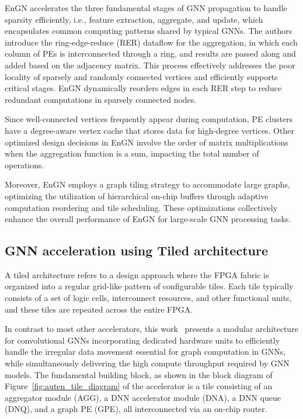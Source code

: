 EnGN accelerates the three fundamental stages of GNN propagation to handle sparsity efficiently, i.e., feature extraction, aggregate, and update, which encapsulates common computing patterns shared by typical GNNs.
The authors introduce the ring-edge-reduce (RER) dataflow for the aggregation, in which each column of PEs is interconnected through a ring, and results are passed along and added based on the adjacency matrix.
This process effectively addresses the poor locality of sparsely and randomly connected vertices and efficiently supports critical stages.
EnGN dynamically reorders edges in each RER step to reduce redundant computations in sparsely connected nodes.

Since well-connected vertices frequently appear during computation, PE clusters have a degree-aware vertex cache that stores data for high-degree vertices.
Other optimized design decisions in EnGN involve the order of matrix multiplications when the aggregation function is a sum, impacting the total number of operations.

Moreover, EnGN employs a graph tiling strategy to accommodate large graphs, optimizing the utilization of hierarchical on-chip buffers through adaptive computation reordering and tile scheduling.
These optimizations collectively enhance the overall performance of EnGN for large-scale GNN processing tasks.

\subsection{GNN acceleration using Tiled architecture}
\label{subsec:tiled-architectures}%

A tiled architecture refers to a design approach where the FPGA fabric is organized into a regular grid-like pattern of configurable tiles.
Each tile typically consists of a set of logic cells, interconnect resources, and other functional units, and these tiles are repeated across the entire FPGA.

In contrast to most other accelerators, this work~\cite{9218751} presents a modular architecture for convolutional GNNs incorporating dedicated hardware units to efficiently handle the irregular data movement essential for graph computation in GNNs, while simultaneously delivering the high compute throughput required by GNN models.
The fundamental building block, as shown in the block diagram of Figure~\ref{fig:auten_tile_diagram} of the accelerator is a tile consisting of an aggregator module (AGG), a DNN accelerator module (DNA), a DNN queue (DNQ), and a graph PE (GPE), all interconnected via an on-chip router.

